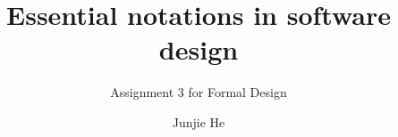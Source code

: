 \documentclass[sigchi,12]{acmart}  %
\begin{document}
\title{Essential notations in software design}
\subtitle{Assignment 3 for Formal Design}
\author{Junjie He}
\begin{abstract}
\end{abstract}
\maketitle



\end{document}
